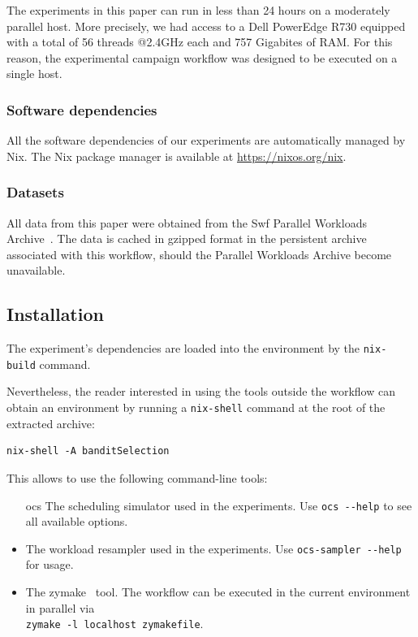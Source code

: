 \documentclass[sigconf,anonymous]{acmart}
\begin{document}
 The experiments in this paper can run in less than 24 hours on a
 moderately parallel host. More precisely, we had access to a Dell PowerEdge
 R730 equipped with a total of 56 threads @2.4GHz each and 757 Gigabites of RAM. For
 this reason, the experimental campaign workflow was designed to be executed on
 a single host.

\subsubsection{Software dependencies}

All the software dependencies of our experiments are automatically managed by Nix.
The Nix package manager is available at \url{https://nixos.org/nix}.

\subsubsection{Datasets}

All data from this paper were obtained from the Swf Parallel Workloads
Archive~\cite{Feitelson20142967}. The data is cached in gzipped format in the
persistent archive associated with this workflow, should the Parallel
Workloads Archive become unavailable.

\subsection{Installation}

The experiment's dependencies are loaded into the environment by the
\lstinline[basicstyle=\ttfamily]|nix-build| command.

Nevertheless, the reader interested in using the tools outside the workflow can
obtain an environment by running a \lstinline[basicstyle=\ttfamily]|nix-shell| command
at the root of the extracted archive:

\begin{lstlisting}
nix-shell -A banditSelection
\end{lstlisting}

This allows to use the following command-line tools:

\begin{itemize}

  \item[ocs] The scheduling simulator used in the experiments. Use
    \lstinline[basicstyle=\ttfamily]|ocs --help| to see all available options.

  \item[ocs-sampler] The workload resampler used in the experiments. Use
    \lstinline[basicstyle=\ttfamily]|ocs-sampler --help| for usage.

  \item[zymake] The zymake~\cite{zymake} tool.
    The workflow can be executed in the current environment in parallel
    via \\ \lstinline[basicstyle=\ttfamily]|zymake -l localhost zymakefile|.

\end{itemize}
\end{document}
